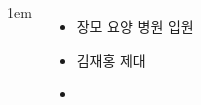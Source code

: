 \documentclass[	20pt, 
							a1paper, 
							portrait, %
							margin=0mm, %
							innermargin=10mm,  		%
							blockverticalspace=4mm, %
							colspace=5mm, 
							subcolspace=0mm
							]{tikzposter}
\begin{document}
\begin{columns}
			{
					\setlength{\leftmargini}{4em}
					\setlength{\labelsep} {1em}
					\begin{itemize}
					\item  장모 요양 병원 입원
					\item  김재홍 제대
					\item  
					\end{itemize}
			} %


	\end{columns}
\end{document}
